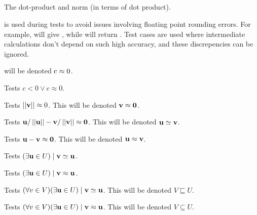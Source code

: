 \subsection{}

The dot-product and norm (in terms of dot product).
\lstoperator
\lstnorm

 is used during tests to avoid issues involving floating point rounding errors.  For example,  will give , while  will return .  Test cases are used where intermediate calculations don't depend on such high accuracy, and these discrepencies can be ignored.

 will be denoted $\mli{c} \approx 0$.
\lstapproximatelyzeroa

Tests $c < 0 \lor c \approx 0$.
\lstapproximatelyltzero

Tests $\left|\left|\mathbf{v}\right|\right| \approx 0$.  This will be denoted $\mathbf{v} \approx \mathbf{0}$.
\lstapproximatelyzerob

Tests $\mathbf{u}/\left|\left|\mathbf{u}\right|\right| - \mathbf{v}/\left|\left|\mathbf{v}\right|\right| \approx \mathbf{0} $.  This will be denoted $\mathbf{u} \simeq \mathbf{v}$.
\lstisequivalent

Tests $\mathbf{u} - \mathbf{v} \approx \mathbf{0}$.  This will be denoted $\mathbf{u} \approx \mathbf{v}$.
\lstisequal

Tests $(\exists \mathbf{u} \in U) \;|\; \mathbf{v} \simeq \mathbf{u}$.
\lsthasequivalentmember

Tests $(\exists \mathbf{u} \in U) \;|\; \mathbf{v} \approx \mathbf{u}$.
\lsthasequalmember

Tests $(\forall v \in V)(\exists \mathbf{u} \in U) \;|\; \mathbf{v} \simeq \mathbf{u}$.  This will be denoted $V \sqsubseteq U$.
\lstsubsetmodeq

Tests $(\forall v \in V)(\exists \mathbf{u} \in U) \;|\; \mathbf{v} \approx \mathbf{u}$.  This will be denoted $V \subseteq U$.
\lstsubset

